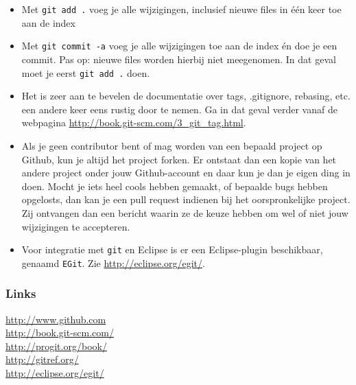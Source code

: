 \begin{itemize}
\item Met {\tt git add .} voeg je alle wijzigingen, inclusief nieuwe
  files in één keer toe aan de index
\item Met {\tt git commit -a} voeg je alle wijzigingen toe aan de
  index én doe je een commit. Pas op: nieuwe files worden hierbij
  niet meegenomen. In dat geval moet je eerst {\tt git add .}
  doen.
\item Het is zeer aan te bevelen de documentatie over tags,
  .gitignore, rebasing, etc. een andere keer eens rustig door te nemen. Ga in dat
  geval verder vanaf de webpagina
  \url{http://book.git-scm.com/3_git_tag.html}. 
\item Als je geen contributor bent of mag worden van een bepaald
  project op Github, kun je altijd het project forken. Er ontstaat dan
  een kopie van het andere project onder jouw Github-account en daar
  kun je dan je eigen ding in doen. Mocht je iets heel cools hebben
  gemaakt, of bepaalde bugs hebben opgelosts, dan kan je een pull
  request indienen bij het oorspronkelijke project. Zij ontvangen dan
  een bericht waarin ze de keuze hebben om wel of niet jouw
  wijzigingen te accepteren.
\item Voor integratie met {\tt git} en Eclipse is er een
  Eclipse-plugin beschikbaar, genaamd {\tt EGit}. Zie \url{http://eclipse.org/egit/}.
\end{itemize}



\subsubsection{Links}
\url{http://www.github.com} \\
\url{http://book.git-scm.com/} \\
\url{http://progit.org/book/} \\
\url{http://gitref.org/} \\
\url{http://eclipse.org/egit/}

